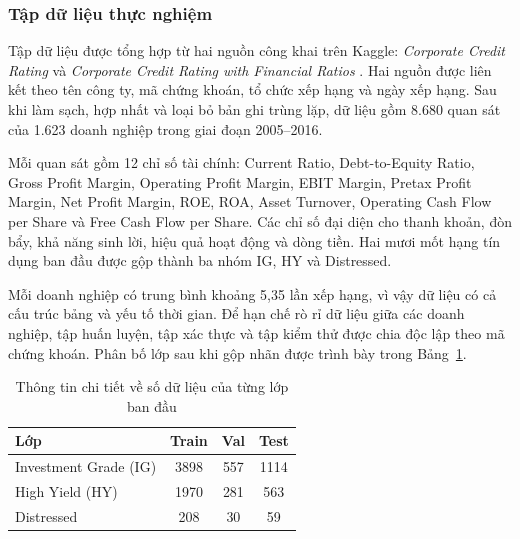\documentclass[10pt,twoside]{article}
\begin{document}
\subsubsection{Tập dữ liệu thực nghiệm}
Tập dữ liệu được tổng hợp từ hai nguồn công khai trên Kaggle: \textit{Corporate Credit Rating} \cite{noauthor_corporate_credit_rating_nodate} và \textit{Corporate Credit Rating with Financial Ratios} \cite{noauthor_corporate_financial_ratios_nodate}. Hai nguồn được liên kết theo tên công ty, mã chứng khoán, tổ chức xếp hạng và ngày xếp hạng. Sau khi làm sạch, hợp nhất và loại bỏ bản ghi trùng lặp, dữ liệu gồm 8.680 quan sát của 1.623 doanh nghiệp trong giai đoạn 2005--2016.

Mỗi quan sát gồm 12 chỉ số tài chính: Current Ratio, Debt-to-Equity Ratio, Gross Profit Margin, Operating Profit Margin, EBIT Margin, Pretax Profit Margin, Net Profit Margin, ROE, ROA, Asset Turnover, Operating Cash Flow per Share và Free Cash Flow per Share. Các chỉ số đại diện cho thanh khoản, đòn bẩy, khả năng sinh lời, hiệu quả hoạt động và dòng tiền. Hai mươi mốt hạng tín dụng ban đầu được gộp thành ba nhóm IG, HY và Distressed.

Mỗi doanh nghiệp có trung bình khoảng 5,35 lần xếp hạng, vì vậy dữ liệu có cả cấu trúc bảng và yếu tố thời gian. Để hạn chế rò rỉ dữ liệu giữa các doanh nghiệp, tập huấn luyện, tập xác thực và tập kiểm thử được chia độc lập theo mã chứng khoán. Phân bố lớp sau khi gộp nhãn được trình bày trong Bảng~\ref{tab:class_distribution}. 
\begin{table}[H] 
\centering 
\caption{Thông tin chi tiết về số dữ liệu của từng lớp ban đầu} 
\label{tab:class_distribution} 
\begin{tabular}{lccc} 
\hline \textbf{Lớp} & \textbf{Train} & \textbf{Val} & \textbf{Test} \\ \hline Investment Grade (IG) & 3898 & 557 & 1114 \\ High Yield (HY) & 1970 & 281 & 563 \\ Distressed & 208 & 30 & 59 \\ \hline 
\end{tabular} 
\end{table}
\end{document}
